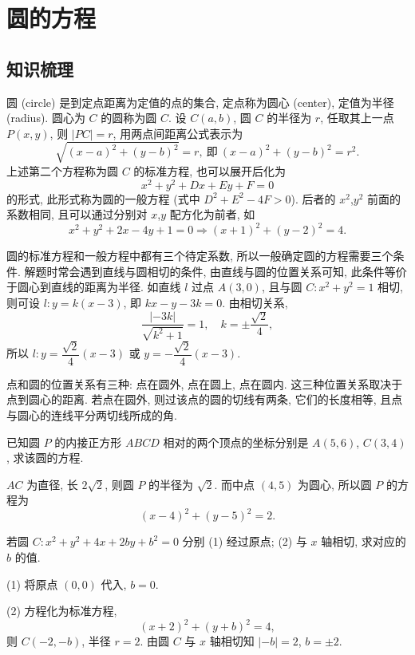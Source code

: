 
\section{圆的方程}

\subsection{知识梳理}

圆 (circle) 是到定点距离为定值的点的集合, 定点称为圆心 (center), 定值为半径 (radius). 圆心为 $C$ 的圆称为圆 $C$. 设 $C(a,b)$, 圆 $C$ 的半径为 $r$, 任取其上一点 $P(x,y)$, 则 $|PC|=r$, 用两点间距离公式表示为
\[\sqrt{(x-a)^2+(y-b)^2}= r,\ \text{即}\ 
    (x-a)^2+(y-b)^2= r^2.\]
上述第二个方程称为圆 $C$ 的标准方程, 也可以展开后化为 
\[x^2+y^2+Dx+Ey+F=0\]
的形式, 此形式称为圆的一般方程 (式中 $D^2+E^2- 4F>0$). 后者的 $x^2$,$y^2$ 前面的系数相同, 且可以通过分别对 $x$,$y$ 配方化为前者, 如
\[x^2+y^2+2x-4y+1=0\Rightarrow
    (x+1)^2+(y-2)^2=4.\]

圆的标准方程和一般方程中都有三个待定系数, 所以一般确定圆的方程需要三个条件. 解题时常会遇到直线与圆相切的条件, 由直线与圆的位置关系可知, 此条件等价于圆心到直线的距离为半径. 如直线 $l$ 过点 $A(3,0)$, 且与圆 $C\colon x^2 +y^2 =1$ 相切, 则可设 $l\colon y=k(x-3)$, 即 $kx-y-3k=0$. 由相切关系,
\[\frac{|-3k|}{\sqrt{k^2+1}}=1,\quad k=\pm\frac{\sqrt2}4,\]
所以 $l\colon y= \dfrac{\sqrt2}4(x-3)$ 或 $y= -\dfrac{\sqrt2}4(x-3)$.

点和圆的位置关系有三种: 点在圆外, 点在圆上, 点在圆内. 这三种位置关系取决于点到圆心的距离. 若点在圆外, 则过该点的圆的切线有两条, 它们的长度相等, 且点与圆心的连线平分两切线所成的角.

\lianxi
\begin{exercise}
    已知圆 $P$ 的内接正方形 $ABCD$ 相对的两个顶点的坐标分别是 $A(5,6)$, $C(3,4)$, 求该圆的方程.
\end{exercise}
\beginsolution
    $AC$ 为直径, 长 $2\sqrt2$, 则圆 $P$ 的半径为 $\sqrt2$. 而中点 $(4,5)$ 为圆心, 所以圆 $P$ 的方程为
    \[(x-4)^2+(y-5)^2= 2.\]
\endsolution

\begin{exercise}
    若圆 $C\colon x^2 +y^2 +4x+2by+b^2 =0$ 分别 (1) 经过原点; (2) 与 $x$ 轴相切, 求对应的 $b$ 的值.
\end{exercise}
\beginsolution
    (1) 将原点 $(0,0)$ 代入, $b=0$.

    (2) 方程化为标准方程,
    \[(x+2)^2+(y+b)^2= 4,\]
    则 $C(-2,-b)$, 半径 $r=2$. 由圆 $C$ 与 $x$ 轴相切知 $|-b|=2$, $b=\pm2$.
\endsolution

